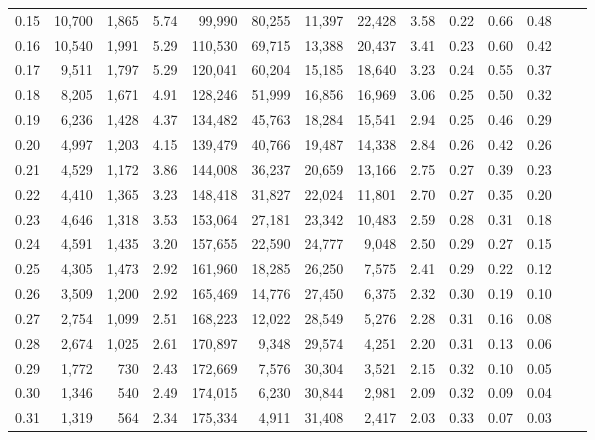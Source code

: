 \begin{tabular}{rrrrrrrrrrrrrr}
0.15 &  10,700 &  1,865 &    5.74 &   99,990 &   80,255 &  11,397 &  22,428 &  3.58 &  0.22 &  0.66 &      0.48 \\
0.16 &  10,540 &  1,991 &    5.29 &  110,530 &   69,715 &  13,388 &  20,437 &  3.41 &  0.23 &  0.60 &      0.42 \\
0.17 &   9,511 &  1,797 &    5.29 &  120,041 &   60,204 &  15,185 &  18,640 &  3.23 &  0.24 &  0.55 &      0.37 \\
0.18 &   8,205 &  1,671 &    4.91 &  128,246 &   51,999 &  16,856 &  16,969 &  3.06 &  0.25 &  0.50 &      0.32 \\
0.19 &   6,236 &  1,428 &    4.37 &  134,482 &   45,763 &  18,284 &  15,541 &  2.94 &  0.25 &  0.46 &      0.29 \\
0.20 &   4,997 &  1,203 &    4.15 &  139,479 &   40,766 &  19,487 &  14,338 &  2.84 &  0.26 &  0.42 &      0.26 \\
0.21 &   4,529 &  1,172 &    3.86 &  144,008 &   36,237 &  20,659 &  13,166 &  2.75 &  0.27 &  0.39 &      0.23 \\
0.22 &   4,410 &  1,365 &    3.23 &  148,418 &   31,827 &  22,024 &  11,801 &  2.70 &  0.27 &  0.35 &      0.20 \\
0.23 &   4,646 &  1,318 &    3.53 &  153,064 &   27,181 &  23,342 &  10,483 &  2.59 &  0.28 &  0.31 &      0.18 \\
0.24 &   4,591 &  1,435 &    3.20 &  157,655 &   22,590 &  24,777 &   9,048 &  2.50 &  0.29 &  0.27 &      0.15 \\
0.25 &   4,305 &  1,473 &    2.92 &  161,960 &   18,285 &  26,250 &   7,575 &  2.41 &  0.29 &  0.22 &      0.12 \\
0.26 &   3,509 &  1,200 &    2.92 &  165,469 &   14,776 &  27,450 &   6,375 &  2.32 &  0.30 &  0.19 &      0.10 \\
0.27 &   2,754 &  1,099 &    2.51 &  168,223 &   12,022 &  28,549 &   5,276 &  2.28 &  0.31 &  0.16 &      0.08 \\
0.28 &   2,674 &  1,025 &    2.61 &  170,897 &    9,348 &  29,574 &   4,251 &  2.20 &  0.31 &  0.13 &      0.06 \\
0.29 &   1,772 &    730 &    2.43 &  172,669 &    7,576 &  30,304 &   3,521 &  2.15 &  0.32 &  0.10 &      0.05 \\
0.30 &   1,346 &    540 &    2.49 &  174,015 &    6,230 &  30,844 &   2,981 &  2.09 &  0.32 &  0.09 &      0.04 \\
0.31 &   1,319 &    564 &    2.34 &  175,334 &    4,911 &  31,408 &   2,417 &  2.03 &  0.33 &  0.07 &      0.03 \\

\end{tabular}
